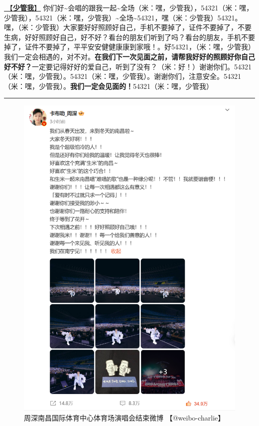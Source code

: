 \documentclass[]{ctexbook}
\begin{document}
\hyperref[watch-ur-manners]{🎵【\textbf{少管我}】} 你们好\textasciitilde 会唱的跟我一起\textasciitilde 全场（米：嘿，少管我），54321（米：嘿，少管我），54321（米：嘿，少管我）\textasciitilde 全场\textasciitilde54321，嘿（米：少管我）54321。嘿，（米：少管我）大家要好好照顾好自己，手机不要掉了，证件不要掉了，不要生病，好好照顾好自己，好不好？看台的朋友们听到了吗？看台的朋友，手机不要掉了，证件不要掉了，平平安安健健康康到家哦！。好54321，（米：嘿，少管我）我们一定会相遇的，对不对。\textbf{在我们下一次见面之前，请帮我好好的照顾好你自己好不好？}一定要记得好好的爱自己，听到了没有？（米：好！）谢谢你们。54321（米：嘿，少管我）。54321（米：嘿，少管我）。谢谢你们，注意安全。54321（米：嘿，少管我）。\textbf{我们一定会见面的！}54321（米：嘿，少管我）

\begin{center}\rule{0.5\linewidth}{0.5pt}\end{center}

\begin{figure}

{\centering \includegraphics{img/weibo/nanchang-20241123} 

}

\caption{周深南昌国际体育中心体育场演唱会结束微博 【@weibo-charlie】}\label{fig:unnamed-chunk-133}
\end{figure}
\end{document}
